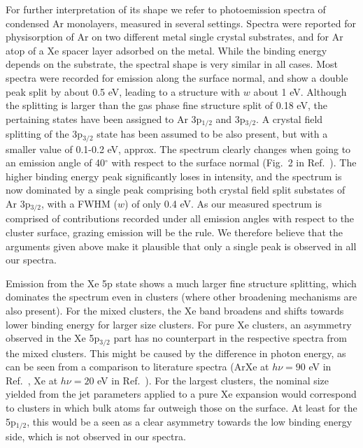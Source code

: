 For further interpretation of its shape we refer to photoemission spectra of condensed Ar monolayers, measured in several settings.\cite{jacobi,jacobi2}
Spectra were reported for physisorption of Ar on two different metal single crystal substrates, and for Ar atop of a Xe spacer layer adsorbed on the metal.
While the binding energy depends on the substrate, the spectral shape is very similar in all cases. 
Most spectra were recorded for emission along the surface normal, and show a double peak split by about 0.5 eV, leading to a structure with $w$ about 1 eV.
Although the splitting is larger than the gas phase fine structure split of 0.18 eV, the pertaining states have been assigned to Ar 3p$_{1/2}$ and 3p$_{3/2}$.
A crystal field splitting of the 3p$_{3/2}$ state has been assumed to be also present, but with a smaller value of 0.1-0.2 eV, approx.\cite{jacobi2} 
The spectrum clearly changes when going to an emission angle of 40$^\circ$ with respect to the surface normal (Fig.\ 2 in Ref.\ \cite{jacobi2}).
The higher binding energy peak significantly loses in intensity, and the spectrum is now dominated by a single peak comprising both crystal field split substates of Ar 3p$_{3/2}$, with a FWHM ($w$) of only 0.4 eV.
As our measured spectrum is comprised of contributions recorded under all emission angles with respect to the cluster surface, grazing emission will be the rule.
We therefore believe that the arguments given above make it plausible that only a single peak is observed in all our spectra.

Emission from the Xe 5p state shows a much larger fine structure splitting, which dominates the spectrum even in clusters (where other broadening mechanisms are also present). 
For the mixed clusters, the Xe band broadens and shifts towards lower binding energy for larger size clusters. 
For pure Xe clusters, an asymmetry observed in the Xe 5p$_{3/2}$ part has no counterpart in the respective spectra from the mixed clusters.
This might be caused by the difference in photon energy, as can be seen from a comparison to literature spectra (ArXe at $h\nu = 90$ eV in Ref.\ \cite{lindblad}, Xe at $h\nu = 20$ eV in Ref.\ \cite{rolles}).
For the largest clusters, the nominal size yielded from the jet parameters applied to a pure Xe expansion would correspond to clusters in which bulk atoms far outweigh those on the surface.
At least for the 5p$_{1/2}$, this would be a seen as a clear asymmetry towards the low binding energy side, which is not observed in our spectra.
{\color{red}{Hier wäre es wichtig zu bemerken, dass es sich um die Bindungsenergie
 des Elektrons und nicht der Atome im Cluster handelt. Das hat mich an mehreren
 Stellen irritiert.}}

